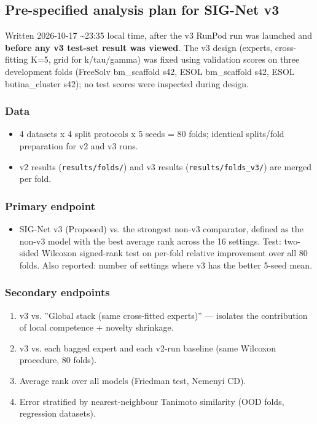 \documentclass[11pt]{article}
\begin{document}
{\small
\subsection*{Pre-specified analysis plan for SIG-Net v3}
Written 2026-10-17 \textasciitilde{}23:35 local time, after the v3 RunPod run was launched and \textbf{before any v3 test-set result was viewed}. The v3 design (experts, cross-fitting K=5, grid for k/tau/gamma) was fixed using validation scores on three development folds (FreeSolv bm\_scaffold s42, ESOL bm\_scaffold s42, ESOL butina\_cluster s42); no test scores were inspected during design.

\subsubsection*{Data}
\begin{itemize}[leftmargin=*,itemsep=1pt,topsep=2pt]
\item 4 datasets x 4 split protocols x 5 seeds = 80 folds; identical splits/fold preparation for v2 and v3 runs.
\item v2 results (\texttt{results/folds/}) and v3 results (\texttt{results/folds\_v3/}) are merged per fold.
\end{itemize}
\subsubsection*{Primary endpoint}
\begin{itemize}[leftmargin=*,itemsep=1pt,topsep=2pt]
\item SIG-Net v3 (Proposed) vs. the strongest non-v3 comparator, defined as the non-v3 model with the best average rank across the 16 settings. Test: two-sided Wilcoxon signed-rank test on per-fold relative improvement over all 80 folds. Also reported: number of settings where v3 has the better 5-seed mean.
\end{itemize}
\subsubsection*{Secondary endpoints}
\begin{enumerate}[leftmargin=*,itemsep=1pt,topsep=2pt]
\item v3 vs. ''Global stack (same cross-fitted experts)'' --- isolates the contribution of local competence + novelty shrinkage.
\item v3 vs. each bagged expert and each v2-run baseline (same Wilcoxon procedure, 80 folds).
\item Average rank over all models (Friedman test, Nemenyi CD).
\item Error stratified by nearest-neighbour Tanimoto similarity (OOD folds, regression datasets).
\end{enumerate}
}
\end{document}
